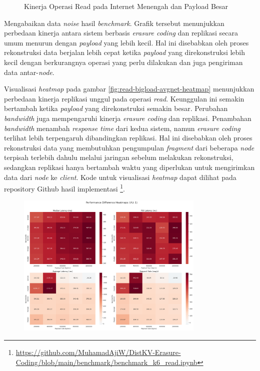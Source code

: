 \begin{enumerate}
\begin{figure}[ht]
    \caption{Kinerja Operasi Read pada Internet Menengah dan Payload Besar}
      \label{fig:read-bigload-avgnet}
  \end{figure}

  Mengabaikan data \textit{noise} hasil \textit{benchmark}. Grafik tersebut menunjukkan perbedaan kinerja antara sistem berbasis \textit{erasure coding} dan replikasi secara umum menurun dengan \textit{payload} yang lebih kecil. Hal ini disebabkan oleh proses rekonstruksi data berjalan lebih cepat ketika \textit{payload} yang direkonstruksi lebih kecil dengan berkurangnya operasi yang perlu dilakukan dan juga pengiriman data antar-\textit{node}.

  Visualisasi \textit{heatmap} pada gambar \ref{fig:read-bigload-avgnet-heatmap} menunjukkan perbedaan kinerja replikasi unggul pada operasi \textit{read}. Keunggulan ini semakin bertambah ketika \textit{payload} yang direkonstruksi semakin besar. Perubahan \textit{bandwidth} juga mempengaruhi kinerja \textit{erasure coding} dan replikasi. Penambahan \textit{bandwidth} menambah \textit{response time} dari kedua sistem, namun \textit{erasure coding} terlihat lebih terpengaruh dibandingkan replikasi. Hal ini disebabkan oleh proses rekonstruksi data yang membutuhkan pengumpulan \textit{fragment} dari beberapa \textit{node} terpisah terlebih dahulu melalui jaringan sebelum melakukan rekonstruksi, sedangkan replikasi hanya bertambah waktu yang diperlukan untuk mengirimkan data dari \textit{node} ke \textit{client}. Kode untuk visualisasi \textit{heatmap} dapat dilihat pada repository Github hasil implementasi \footnote{\url{https://github.com/MuhamadAjiW/DistKV-Erasure-Coding/blob/main/benchmark/benchmark_k6_read.ipynb}}.

  \begin{figure}[ht]
    \centering
    \includegraphics[width=0.8\textwidth]{resources/chapter-4/read_bigload_avgnet_heatmap.png}


\end{figure}
\end{enumerate}
